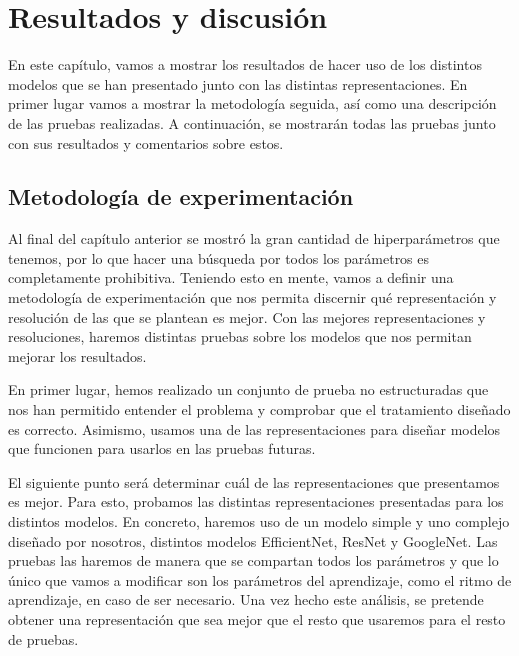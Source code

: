 \documentclass[a4paper,12pt,oneside,titlepage]{book}
\begin{document}
\chapter{Resultados y discusión}
\label{sec:resultados}

En este capítulo, vamos a mostrar los resultados de hacer uso de los distintos modelos que se han presentado junto con las distintas representaciones. En primer lugar vamos a mostrar la metodología seguida, así como una descripción de las pruebas realizadas. A continuación, se mostrarán todas las pruebas junto con sus resultados y comentarios sobre estos. 


\section{Metodología de experimentación}

Al final del capítulo anterior se mostró la gran cantidad de hiperparámetros que tenemos, por lo que hacer una búsqueda por todos los parámetros es completamente prohibitiva. Teniendo esto en mente, vamos a definir una metodología de experimentación que nos permita discernir qué representación y resolución de las que se plantean es mejor. Con las mejores representaciones y resoluciones, haremos distintas pruebas sobre los modelos que nos permitan mejorar los resultados.
 
En primer lugar, hemos realizado un conjunto de prueba no estructuradas que nos han permitido entender el problema y comprobar que el tratamiento diseñado es correcto. Asimismo, usamos una de las representaciones para diseñar modelos que funcionen para usarlos en las pruebas futuras.
 
El siguiente punto será determinar cuál de las representaciones que presentamos es mejor. Para esto, probamos las distintas representaciones presentadas para los distintos modelos. En concreto, haremos uso de un modelo simple y uno complejo diseñado por nosotros, distintos modelos EfficientNet, ResNet y GoogleNet. Las pruebas las haremos de manera que se compartan todos los parámetros y que lo único que vamos a modificar son los parámetros del aprendizaje, como el ritmo de aprendizaje, en caso de ser necesario. Una vez hecho este análisis, se pretende obtener una representación que sea mejor que el resto que usaremos para el resto de pruebas.
 
\end{document}
